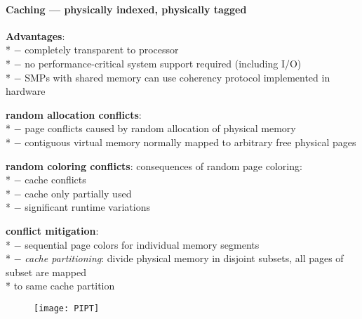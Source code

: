 \paragraph{Caching --- physically indexed, physically tagged}
\begin{items}
  \item \textbf{Advantages}: \\*
    $ - $ completely transparent to processor \\*
    $ - $ no performance-critical system support required (including I/O) \\*
    $ - $ SMPs with shared memory can use coherency protocol implemented in hardware
  \item \textbf{random allocation conflicts}: \\*
    $ - $ page conflicts caused by random allocation of physical memory \\*
    $ - $ contiguous virtual memory normally mapped to arbitrary free physical pages
  \item \textbf{random coloring conflicts}: consequences of random page coloring: \\*
    $ - $ cache conflicts \\*
    $ - $ cache only partially used \\*
    $ - $ significant runtime variations
  \item \textbf{conflict mitigation}: \\*
    $ - $ sequential page colors for individual memory segments \\*
    $ - $ \emph{cache partitioning}: divide physical memory in disjoint subsets, all pages of subset are mapped \\* \phantom{$ - $} \phantom{$ \cdot $} to same cache partition
\end{items}
\begin{figure}[H]\centering\label{PIPT}\texttt{[image: PIPT]}\end{figure}